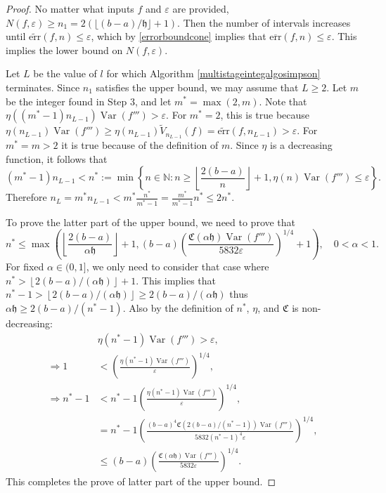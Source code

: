 \documentclass{iitthesis}
\DeclareMathOperator{\Var}{Var}
\theoremstyle{definition}
\theoremstyle{remark}
\begin{document}
\begin{proof}
  No matter what inputs $f$ and $\varepsilon$ are provided, $N(f,\varepsilon)\ge n_1=2(\lfloor (b-a)/\mathfrak{h}\rfloor+1)$. Then the number of intervals increases until $\widetilde{\text{err}}(f,n)\le\varepsilon$, which by \eqref{errorboundcone} implies that $\overline{\text{err}}(f,n)\le\varepsilon$. This implies the lower bound on $N(f,\varepsilon)$.

  Let $L$ be the value of $l$ for which Algorithm \ref{multistageintegalgosimpson} terminates. Since $n_1$ satisfies the upper bound, we may assume that $L \ge 2$. Let $m$ be the integer found in Step 3, and let $m^*=\max(2,m)$. Note that $\eta((m^*-1)n_{L-1})\Var(f''')>\varepsilon$. For $m^*=2$, this is true because $\eta(n_{L-1})\Var(f''')\ge\eta(n_{L-1})\widetilde{V}_{n_{L-1}}(f)=\widetilde{\text{err}}(f,n_{L-1})>\varepsilon$. For $m^*=m>2$ it is true because of the definition of $m$. Since $\eta$ is a decreasing function, it follows that
  $$(m^*-1)n_{L-1}<n^*:=\min\left\{n\in\mathbb{N}:n\ge\left\lfloor\frac{2(b-a)}{n}\right\rfloor+1,\eta(n)\Var(f''')\le\varepsilon\right\}.$$
  Therefore $n_L=m^*n_{L-1}<m^*\frac{n^*}{m^*-1}=\frac{m^*}{m^*-1}n^*\le2n^*$.

  To prove the latter part of the upper bound, we need to prove that
  $$n^*\leq\max\left(\left\lfloor\frac{2(b-a)}{\alpha\mathfrak{h}}\right\rfloor+1,(b-a)\left(\frac{\mathfrak{C}(\alpha\mathfrak{h})\Var(f''')}{5832\varepsilon}\right)^{1/4}+1\right),\quad 0<\alpha<1.$$
  For fixed $\alpha\in(0,1]$, we only need to consider that case where $n^*>\left\lfloor2(b-a)/(\alpha\mathfrak{h})\right\rfloor+1$. This implies that $n^*-1>\left\lfloor2(b-a)/(\alpha\mathfrak{h})\right\rfloor\ge 2(b-a)/(\alpha\mathfrak{h})$ thus $\alpha\mathfrak{h}\ge2(b-a)/(n^*-1)$. Also by the definition of $n^*$, $\eta$, and $\mathfrak{C}$ is non-decreasing:
  \begin{align*}
    &\eta(n^*-1)\Var(f''')>\varepsilon, \\
    \Rightarrow 1&<\left(\frac{\eta(n^*-1)\Var(f''')}{\varepsilon}\right)^{1/4},\\
    \Rightarrow n^*-1&<n^*-1\left(\frac{\eta(n^*-1)\Var(f''')}{\varepsilon}\right)^{1/4},\\
    &=n^*-1\left(\frac{(b-a)^4\mathfrak{C}(2(b-a)/(n^*-1))\Var(f''')}{5832(n^*-1)^4\varepsilon}\right)^{1/4},\\
    &\le(b-a)\left(\frac{\mathfrak{C}(\alpha\mathfrak{h})\Var(f''')}{5832\varepsilon}\right)^{1/4}.
  \end{align*}
  This completes the prove of latter part of the upper bound.
\end{proof}
\end{document}
